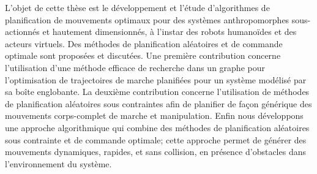 \begin{resume}
L'objet de cette th\`ese est le d\'eveloppement et l'\'etude d'algorithmes
de planification de mouvements optimaux pour des syst\`emes
anthropomorphes sous-actionn\'es et hautement dimensionn\'es, \`a l'instar
des robots humano\"ides et des acteurs virtuels. Des m\'ethodes de
planification al\'eatoires et de commande optimale sont propos\'ees et
discut\'ees. Une premi\`ere contribution concerne l'utilisation d'une
m\'ethode efficace de recherche dans un graphe pour l'optimisation de
trajectoires de marche planifi\'ees pour un syst\`eme mod\'elis\'e par sa
boîte englobante. La deuxi\`eme contribution concerne l'utilisation de
m\'ethodes de planification al\'eatoires sous contraintes afin de
planifier de façon g\'en\'erique des mouvements corps-complet de marche et
manipulation. Enfin nous d\'eveloppons une approche algorithmique qui
combine des m\'ethodes de planification al\'eatoires sous contrainte et de
commande optimale; cette approche permet de g\'en\'erer des mouvements
dynamiques, rapides, et sans collision, en pr\'esence d'obstacles dans
l’environnement du syst\`eme.
\end{resume}
